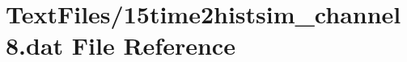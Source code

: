 \hypertarget{15time2histsim__channel8_8dat}{}\section{Text\+Files/15time2histsim\+\_\+channel8.dat File Reference}
\label{15time2histsim__channel8_8dat}
